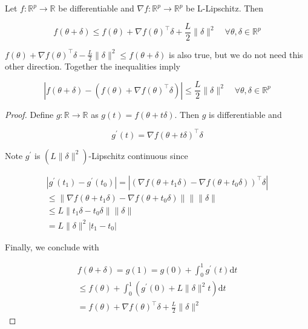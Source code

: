 \begin{theorem}
    Let $f: \mathbb{R}^{p} \rightarrow \mathbb{R}$ be differentiable and $\nabla f: \mathbb{R}^{p} \rightarrow \mathbb{R}^{p}$ be L-Lipschitz. Then

    $$
    f(\theta+\delta) \leq f(\theta)+\nabla f(\theta)^{\top} \delta+\frac{L}{2}\|\delta\|^{2} \quad \forall \theta, \delta \in \mathbb{R}^{p}
    $$

    \par\noindent\textcolor{gray}{\hdashrule{\textwidth}{0.4pt}{1pt 2pt}}

    $f(\theta)+\nabla f(\theta)^{\top} \delta-\frac{L}{2}\|\delta\|^{2} \leq f(\theta+\delta)$ is also true, but we do not need this other direction. Together the inequalities imply

    $$
    \left|f(\theta+\delta)-\left(f(\theta)+\nabla f(\theta)^{\top} \delta\right)\right| \leq \frac{L}{2}\|\delta\|^{2} \quad \forall \theta, \delta \in \mathbb{R}^{p}
    $$

    \begin{proof}
        Define $g: \mathbb{R} \rightarrow \mathbb{R}$ as $g(t)=f(\theta+t \delta)$. Then $g$ is differentiable and

        $$
        g^{\prime}(t)=\nabla f(\theta+t \delta)^{\top} \delta
        $$

        Note $g^{\prime}$ is $\left(L\|\delta\|^{2}\right)$-Lipschitz continuous since

        $$
        \begin{gathered}
        \left|g^{\prime}\left(t_{1}\right)-g^{\prime}\left(t_{0}\right)\right|=\left|\left(\nabla f\left(\theta+t_{1} \delta\right)-\nabla f\left(\theta+t_{0} \delta\right)\right)^{\top} \delta\right| \\
        \leq\left\|\nabla f\left(\theta+t_{1} \delta\right)-\nabla f\left(\theta+t_{0} \delta\right)\right\|\| \| \delta \| \\
        \leq L\left\|t_{1} \delta-t_{0} \delta\right\|\|\delta\| \\
        =L\|\delta\|^{2}\left|t_{1}-t_{0}\right|
        \end{gathered}
        $$

        Finally, we conclude with

        $$
        \begin{gathered}
        f(\theta+\delta)=g(1)=g(0)+\int_{0}^{1} g^{\prime}(t) \mathrm{d} t \\
        \leq f(\theta)+\int_{0}^{1}\left(g^{\prime}(0)+L\|\delta\|^{2} t\right) \mathrm{d} t \\
        =f(\theta)+\nabla f(\theta)^{\top} \delta+\frac{L}{2}\|\delta\|^{2}
        \end{gathered}
        $$
    \end{proof}
\end{theorem}

